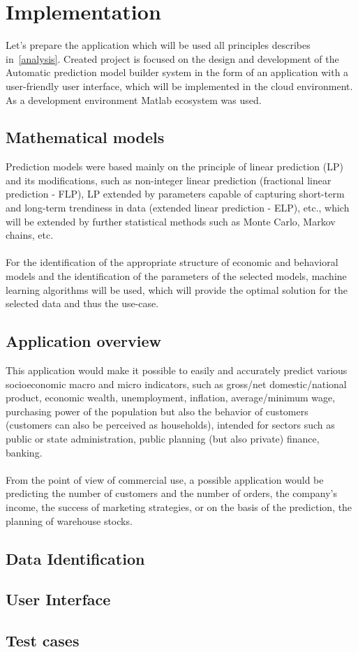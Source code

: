 \chapter{Implementation}
    Let's prepare the application which will be used all principles describes in~\ref{analysis}. Created project is focused on the design and development of the Automatic prediction model builder system in the form of an application with a user-friendly user interface, which will be implemented in the cloud environment. As a development environment Matlab ecosystem was used.
    \section{Mathematical models}
    Prediction models were based mainly on the principle of linear prediction (LP) and its modifications, such as non-integer linear prediction (fractional linear prediction - FLP), LP extended by parameters capable of capturing short-term and long-term trendiness in data (extended linear prediction - ELP), etc., which will be extended by further statistical methods such as Monte Carlo, Markov chains, etc.\\
    \\
    For the identification of the appropriate structure of economic and behavioral models and the identification of the parameters of the selected models, machine learning algorithms will be used, which will provide the optimal solution for the selected data and thus the use-case.
    \section{Application overview}
    This application would make it possible to easily and accurately predict various socioeconomic macro and micro indicators, such as gross/net domestic/national product, economic wealth, unemployment, inflation, average/minimum wage, purchasing power of the population but also the behavior of customers (customers can also be perceived as households), intended for sectors such as public or state administration, public planning (but also private) finance, banking.\\
    \\
    From the point of view of commercial use, a possible application would be predicting the number of customers and the number of orders, the company's income, the success of marketing strategies, or on the basis of the prediction, the planning of warehouse stocks.
    \section{Data Identification}
    \section{User Interface}
    \section{Test cases}